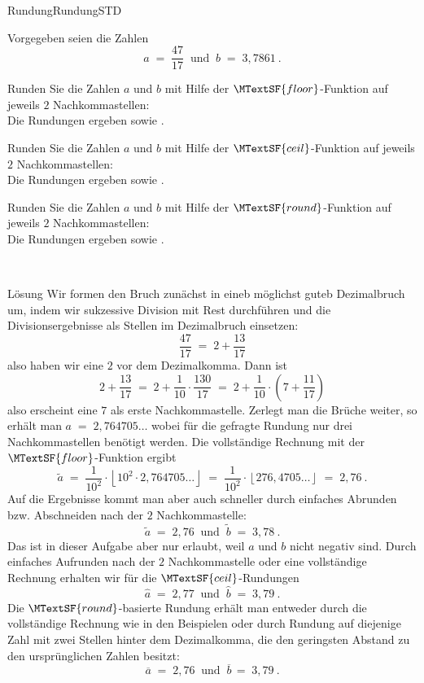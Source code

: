 \begin{MXContent}{Rundung}{Rundung}{STD}
\begin{MExercise}
Vorgegeben seien die Zahlen
$$
a\; =\; \frac{47}{17} \;\;\text{und}\;\;  b\; =\; 3,7861\: .
$$
\begin{MExerciseItems}
\item{Runden Sie die Zahlen $a$ und $b$ mit Hilfe der $\MTextSF{floor}$-Funktion auf jeweils $2$ Nachkommastellen:\\Die Rundungen ergeben
 sowie .}
\item{Runden Sie die Zahlen $a$ und $b$ mit Hilfe der $\MTextSF{ceil}$-Funktion auf jeweils $2$ Nachkommastellen:\\Die Rundungen ergeben
 sowie .}
\item{Runden Sie die Zahlen $a$ und $b$ mit Hilfe der $\MTextSF{round}$-Funktion auf jeweils $2$ Nachkommastellen:\\Die Rundungen ergeben
 sowie .}
\end{MExerciseItems}
\ \\
\begin{MHint}{Lösung}
Wir formen den Bruch zunächst in eineb möglichst guteb Dezimalbruch um, indem wir sukzessive Division mit Rest durchführen und die Divisionsergebnisse als Stellen im Dezimalbruch einsetzen:
$$
\frac{47}{17} \;=\; 2+\frac{13}{17}
$$
also haben wir eine $2$ vor dem Dezimalkomma. Dann ist
$$
2+\frac{13}{17} \;=\; 2+\frac1{10}\cdot \frac{130}{17} \;=\; 2+\frac1{10}\cdot\left({7+\frac{11}{17}}\right)
$$
also erscheint eine $7$ als erste Nachkommastelle. Zerlegt man die Brüche weiter, so erhält man  $a\;=\;  2,764705\ldots$ wobei für die gefragte Rundung nur drei Nachkommastellen benötigt werden.
Die vollständige Rechnung mit der $\MTextSF{floor}$-Funktion ergibt
$$
\tilde a \;=\; \frac1{10^2}\cdot \left\lfloor{ 10^2\cdot 2,764705\ldots}\right\rfloor \;=\; \frac1{10^2}\cdot \left\lfloor{ 276,4705\ldots}\right\rfloor \;=\;  2,76\: .
$$
Auf die Ergebnisse kommt man aber auch schneller durch einfaches Abrunden bzw. Abschneiden nach der $2$ Nachkommastelle:
$$
\tilde a \;=\; 2,76\;\; \text{und}\;\; \tilde b \;=\; 3,78\: .
$$
Das ist in dieser Aufgabe aber nur erlaubt, weil $a$ und $b$ nicht negativ sind.
Durch einfaches Aufrunden nach der $2$ Nachkommastelle oder eine vollständige Rechnung erhalten wir für die $\MTextSF{ceil}$-Rundungen
$$
\hat a \;=\; 2,77\;\; \text{und}\;\; \hat b \;=\; 3,79\: .
$$
Die $\MTextSF{round}$-basierte Rundung erhält man entweder durch die vollständige Rechnung wie in den Beispielen
oder durch Rundung auf diejenige Zahl mit zwei Stellen hinter dem Dezimalkomma, die den geringsten Abstand zu den ursprünglichen Zahlen besitzt:
$$
\overline{a} \; = \; 2,76 \;\; \text{und}\;\; \overline{b} \,=\; 3,79\: .
$$
\end{MHint}
\end{MExercise}


\end{MXContent}
